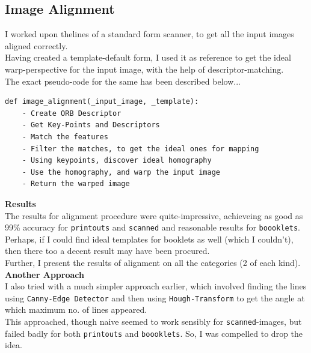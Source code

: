 \documentclass{article}
\begin{document}
    \subsection*{Image Alignment}
    I worked upon the\e lines of a standard form scanner, to get all the input images aligned correctly.\\
    Having created a template-default form, I used it as reference to get the ideal warp-perspective for the input image, with the help of descriptor-matching.\\
    The exact pseudo-code for the same has been described below...\\
    \begin{lstlisting}
def image_alignment(_input_image, _template):
    - Create ORB Descriptor
    - Get Key-Points and Descriptors
    - Match the features
    - Filter the matches, to get the ideal ones for mapping
    - Using keypoints, discover ideal homography
    - Use the homography, and warp the input image
    - Return the warped image
    \end{lstlisting}
\textbf{Results}\\
    The results for alignment procedure were quite-impressive, achieveing as good as 99\% accuracy for \texttt{printouts} and \texttt{scanned} and reasonable results for \texttt{boooklets}. Perhaps, if I could find ideal templates for booklets as well (which I couldn't), then there too a decent result may have been procured.\\
    Further, I present the results of alignment on all the categories (2 of each kind).\\
\textbf{Another Approach}\\
    I also tried with a much simpler approach earlier, which involved finding the lines using \texttt{Canny-Edge Detector} and then using \texttt{Hough-Transform} to get the angle at which maximum no. of lines appeared.\\ This approached, though naive seemed to work sensibly for \texttt{scanned}-images, but failed badly for both \texttt{printouts} and \texttt{boooklets}. So, I was compelled to drop the idea.
\pagebreak
\end{document}
